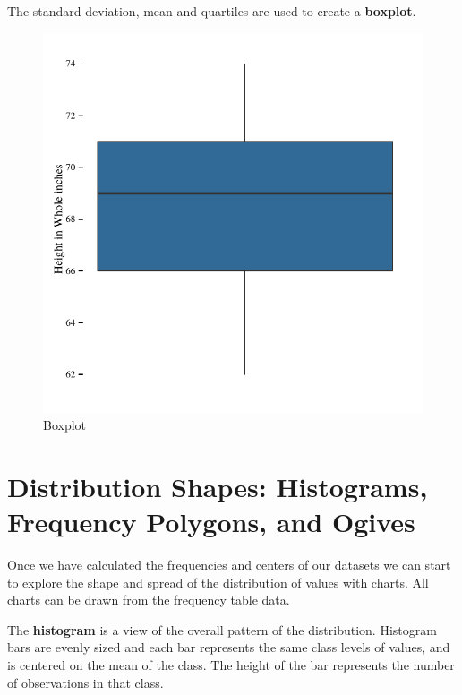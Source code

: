 \documentclass[nohyper,justified]{tufte-handout}\usepackage[]{graphicx}\usepackage[]{color}
\makeatletter
\def\maxwidth{ %
  \ifdim\Gin@nat@width>\linewidth
    \linewidth
  \else
    \Gin@nat@width
  \fi
}
\newenvironment{knitrout}{}{} %
\makeatother
\begin{document}
The standard deviation, mean and quartiles are used to create a \textbf{boxplot}.

\begin{knitrout}
\color{fgcolor}\begin{figure}

{\centering \includegraphics[width=\maxwidth]{figure/graphics-boxplot-1} 

}

\caption[Boxplot]{Boxplot}\label{fig:boxplot}
\end{figure}


\end{knitrout}

\section{Distribution Shapes: Histograms, Frequency Polygons, and Ogives}

Once we have calculated the frequencies and centers of our datasets we can start to explore the shape and spread of the distribution of values with charts. All charts can be drawn from the frequency table data.

The \textbf{histogram} is a view of the overall pattern of the distribution. Histogram bars are evenly sized and each bar represents the same class levels of values, and is centered on the mean of the class. The height of the bar represents the number of observations in that class.
\end{document}
